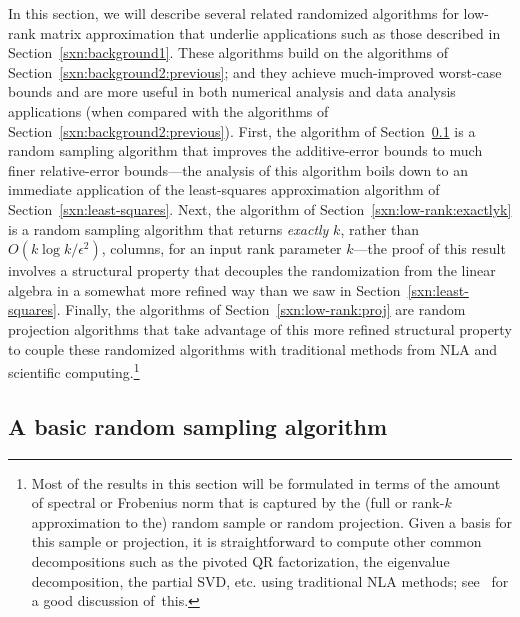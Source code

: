 \documentclass[twoside]{article}
\begin{document}
In this section, we will describe several related randomized algorithms 
for low-rank matrix approximation that underlie applications such as those 
described in Section~\ref{sxn:background1}.
These algorithms build on the algorithms of 
Section~\ref{sxn:background2:previous}; and they achieve much-improved
worst-case bounds and are more useful in both numerical analysis and data 
analysis applications (when compared with the algorithms of Section~\ref{sxn:background2:previous}).
First, the algorithm of Section~\ref{sxn:low-rank:relerr} is a random 
sampling algorithm that improves the additive-error bounds to much finer 
relative-error bounds---the analysis of this algorithm boils down to an 
immediate application of the least-squares approximation algorithm of 
Section~\ref{sxn:least-squares}.
Next, the algorithm of Section~\ref{sxn:low-rank:exactlyk} is a random 
sampling algorithm that returns \emph{exactly} $k$, rather than 
$O(k \log k/\epsilon^2)$, columns, for an input rank parameter $k$---the 
proof of this result involves a structural property that decouples the 
randomization from the linear algebra in a somewhat more refined way than 
we saw in Section~\ref{sxn:least-squares}.
Finally, the algorithms of Section~\ref{sxn:low-rank:proj} are random 
projection algorithms that take advantage of this more refined structural 
property to couple these randomized algorithms with traditional methods 
from NLA and scientific computing.\footnote{Most of the results in this section will be formulated in terms of 
the amount of spectral or Frobenius norm that is captured by the (full or 
rank-$k$ approximation to the) random sample or random projection.
Given a basis for this sample or projection, it is straightforward to 
compute other common decompositions such as the pivoted QR factorization, 
the eigenvalue decomposition, the partial SVD, etc. using traditional NLA
methods; see~\cite{HMT09_SIREV} for a good discussion of~this.}





\subsection{A basic random sampling algorithm}
\label{sxn:low-rank:relerr}
\end{document}
